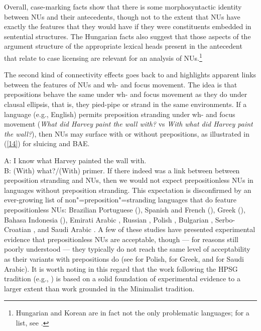 \documentclass[output=paper
	        ,collection
	        ,collectionchapter
 	        ,biblatex
                ,babelshorthands
                ,newtxmath
                ,draftmode
                ,colorlinks, citecolor=brown
]{langscibook}
\begin{document}
{Overall, case-marking facts show that there is some morphosyntactic identity between NUs and their antecedents, though not to the extent that NUs have exactly the features that they would have if they were constituents embedded in sentential structures. The Hungarian facts also suggest that those aspects of the argument structure of the appropriate lexical heads present in the antecedent that relate to case licensing are relevant for an analysis of NUs.\footnote{Hungarian and Korean are in fact not the only problematic languages; for a list, see \citet{Vicente2015}.}

The second kind of connectivity effects goes back to \citet{Merchant2001, Merchant2005a} and highlights apparent links between the features of NUs and wh- and focus movement. The idea is that prepositions behave the same under wh- and focus movement as they do under clausal ellipsis, that is, they pied-pipe or strand in the same environments. If a language (e.g., English) permits preposition stranding under wh- and focus movement (\emph{What did Harvey paint the wall with?} vs \emph{With what did Harvey paint the wall?}), then NUs may surface with or without prepositions, as illustrated in (\ref{14}) for sluicing and BAE.


\ea A: I know what Harvey painted the wall with.\\B: (With) what?/(With) primer.\label{14}\z
If there indeed was a link between between preposition stranding and NUs, then we would not expect prepositionless NUs in languages without preposition stranding. This expectation is disconfirmed by an ever-growing list of non"=preposition"=stranding languages that do feature prepositionless NUs: Brazilian Portuguese (\citealt{AlmeidaYoshida2007}), Spanish and French (\citealt{Rodrigues2006}), Greek (\citealt{Molimpakis2018}), Bahasa Indonesia (\citealt{Fortin2007}), Emirati Arabic \citep{Leung2014}, Russian \citep{Philippova2014}, Polish \citep{Szczegielniak2008, Sag2011, Nykiel2013}, %
Bulgarian \citep{Abels2017}, Serbo-Croatian \citep{Stjepanovic2008, Stjepanovic2012}, and Saudi Arabic \citep{Alshaalan2020}. A few of these studies have presented experimental evidence that prepositionless NUs are acceptable, though --- for reasons still poorly understood --- they typically do not reach the same level of acceptability as their variants with prepositions do (see \citealt{Nykiel2013} for Polish, \citealt{Molimpakis2018} for Greek, and \citealt{Alshaalan2020} for Saudi Arabic). It is worth noting in this regard that the work following the HPSG tradition (e.g., \citealt{Sag2011}) is based on a solid foundation of experimental evidence to a larger extent than work grounded in the Minimalist tradition.

}
\end{document}
